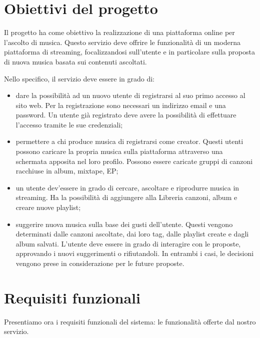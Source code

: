 \documentclass[a4paper,12pt]{article}
\begin{document}
\section{Obiettivi del progetto}

Il progetto ha come obiettivo la realizzazione di una piattaforma online per l’ascolto di musica. Questo servizio deve offrire le funzionalità di un moderna piattaforma di streaming, focalizzandosi sull’utente e in particolare sulla proposta di nuova musica basata sui contenuti ascoltati.

Nello specifico, il servizio deve essere in grado di:

\begin{itemize}
    \item dare la possibilità ad un nuovo utente di registrarsi al suo primo accesso al sito web. Per la registrazione sono necessari un indirizzo email e una password. Un utente già registrato deve avere la possibilità di effettuare l’accesso tramite le sue credenziali;
    \item permettere a chi produce musica di registrarsi come creator. Questi utenti possono caricare la propria musica sulla piattaforma attraverso una schermata apposita nel loro profilo. Possono essere caricate gruppi di canzoni racchiuse in album, mixtape, EP;
    \item un utente dev’essere in grado di cercare, ascoltare e riprodurre musica in streaming. Ha la possibilità di aggiungere alla Libreria canzoni, album e creare nuove playlist;
    \item suggerire nuova musica sulla base dei gusti dell’utente. Questi vengono determinati dalle canzoni ascoltate, dai loro tag, dalle playlist create e dagli album salvati. L’utente deve essere in grado di interagire con le proposte, approvando i nuovi suggerimenti o rifiutandoli. In entrambi i casi, le decisioni vengono prese in considerazione per le future proposte.
\end{itemize}

\newpage
\section{Requisiti funzionali}

Presentiamo ora i requisiti funzionali del sistema: le funzionalità offerte dal nostro servizio.
\end{document}

